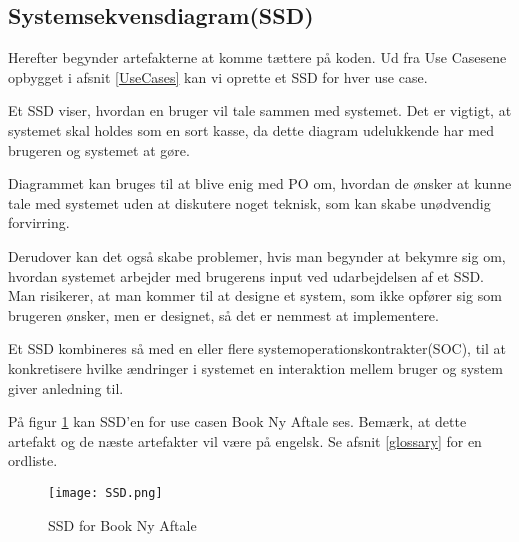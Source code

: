 \subsection{Systemsekvensdiagram(SSD)}
\label{SSD}

Herefter begynder artefakterne at komme tættere på koden.
Ud fra Use Casesene opbygget i afsnit \ref{UseCases} kan vi oprette et SSD for hver use case.

Et SSD viser, hvordan en bruger vil tale sammen med systemet.
Det er vigtigt, at systemet skal holdes som en sort kasse, da dette diagram udelukkende har med brugeren og systemet at gøre.

Diagrammet kan bruges til at blive enig med PO om, hvordan de ønsker at kunne tale med systemet uden at diskutere noget teknisk, som kan skabe unødvendig forvirring.

Derudover kan det også skabe problemer, hvis man begynder at bekymre sig om, hvordan systemet arbejder med brugerens input ved udarbejdelsen af et SSD.
Man risikerer, at man kommer til at designe et system, som ikke opfører sig som brugeren ønsker, men er designet, så det er nemmest at implementere.

Et SSD kombineres så med en eller flere systemoperationskontrakter(SOC), til at konkretisere hvilke ændringer i systemet en interaktion mellem bruger og system giver anledning til.

På figur \ref{forretning:ssd} kan SSD'en for use casen Book Ny Aftale ses.
Bemærk, at dette artefakt og de næste artefakter vil være på engelsk.
Se afsnit \ref{glossary} for en ordliste.

\begin{figure}[H]
    \caption{SSD for Book Ny Aftale}
    \centering
        \texttt{[image: SSD.png]}
    \label{forretning:ssd}
\end{figure}